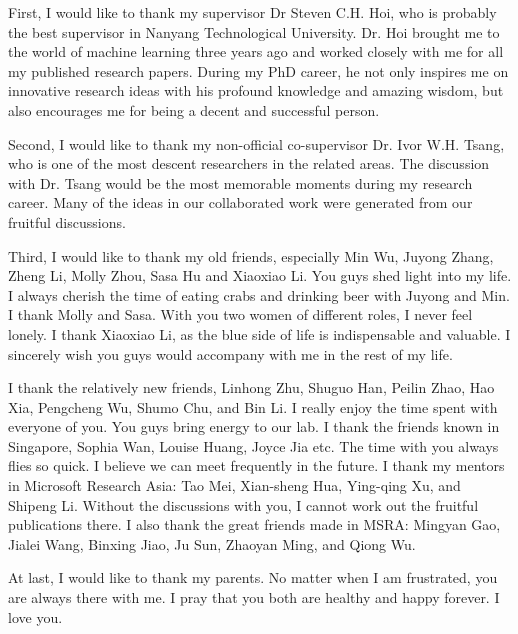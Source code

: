 First, I would like to thank my supervisor Dr Steven C.H. Hoi, who is probably the best supervisor in Nanyang Technological University. Dr. Hoi brought me to the world of machine learning three years ago and worked closely with me for all my published research papers. During my PhD career, he not only inspires me on innovative research ideas with his profound knowledge and amazing wisdom, but also encourages me for being a decent and successful person.

Second, I would like to thank my non-official co-supervisor Dr. Ivor W.H. Tsang, who is one of the most descent researchers in the related areas. The discussion with Dr. Tsang would be the most memorable moments during my research career. Many of the ideas in our collaborated work were generated from our fruitful discussions.

Third, I would like to thank my old friends, especially Min Wu, Juyong Zhang, Zheng Li, Molly Zhou, Sasa Hu and Xiaoxiao Li. You guys shed light into my life. I always cherish the time of eating crabs and drinking beer with Juyong and Min. I thank Molly and Sasa. With you two women of different roles, I never feel lonely. I thank Xiaoxiao Li, as the blue side of life is indispensable and valuable. I sincerely wish you guys would accompany with me in the rest of my life.

I thank the relatively new friends, Linhong Zhu, Shuguo Han, Peilin Zhao, Hao Xia, Pengcheng Wu, Shumo Chu, and Bin Li. I really enjoy the time spent with everyone of you. You guys bring energy to our lab. I thank the friends known in Singapore, Sophia Wan, Louise Huang, Joyce Jia etc. The time with you always flies so quick. I believe we can meet frequently in the future. I thank my mentors in Microsoft Research Asia: Tao Mei, Xian-sheng Hua, Ying-qing Xu, and Shipeng Li. Without the discussions with you, I cannot work out the fruitful publications there. I also thank the great friends made in MSRA: Mingyan Gao, Jialei Wang, Binxing Jiao, Ju Sun, Zhaoyan Ming, and Qiong Wu.

At last, I would like to thank my parents. No matter when I am frustrated, you are always there with me. I pray that you both are healthy and happy forever. I love you.
